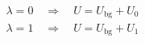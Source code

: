 


\begin{eqnarray*}
  \lambda = 0 \quad\Rightarrow\quad U = U_{\mathrm{bg}} + U_0 \\
  \lambda = 1 \quad\Rightarrow\quad U = U_{\mathrm{bg}} + U_1 
\end{eqnarray*}


